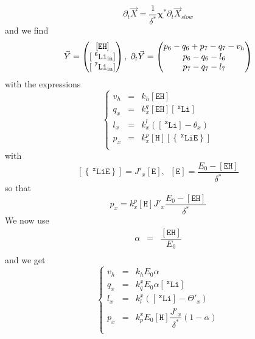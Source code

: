 \documentclass[aps,onecolumn,12pt]{revtex4}
\newcommand{\mychem}[1]{\mathtt{#1}}
\newcommand{\myconc}[1]{\left\lbrack{#1}\right\rbrack}
\newcommand{\spLi}[1]{{~^{\mychem{#1}}\mychem{Li}}}
\newcommand{\Li}[1]{\myconc{\spLi{#1}}}
\newcommand{\spEout}{\mychem{E}}
\newcommand{\Eout}{\myconc{\spEout}}
\newcommand{\spLiE}[1]{\left\lbrace\spLi{#1}\spEout\right\rbrace}
\newcommand{\LiE}[1]{\myconc{\spLiE{#1}}}
\newcommand{\spLiIn}[1]{{\spLi{#1}}_{\mathrm{in}}}
\newcommand{\LiIn}[1]{\myconc{\spLiIn{#1}}}
\newcommand{\spEHin}{\mychem{EH}}
\newcommand{\EHin}{\myconc{\spEHin}}
\newcommand{\spproton}{\mychem{H}}
\newcommand{\proton}{\myconc{\spproton}}
\newcommand{\mymat}[1]{{\bm{#1}}}
\begin{document}
\begin{equation}
	\partial_t\vec{X} = \dfrac{1}{\delta^\ast}
	\mymat{\chi}^\ast \partial_t\vec{X}_{slow}
\end{equation}
and we find
\begin{equation}
	\vec{Y} = \begin{pmatrix} \EHin \cr \LiIn{6} \cr \LiIn{7} \end{pmatrix}
	,\;\partial_t \vec{Y} = 
	\begin{pmatrix}
	p_6-q_6+p_7-q_7-v_h\\
	p_6-q_6-l_6\\
	p_7-q_7-l_7
	\end{pmatrix}
\end{equation}
with the expressions
\begin{equation}
\left\lbrace
	\begin{array}{rcl}
	v_h & = & k_h \EHin \\
	q_x & = & k_x^q \EHin \Li{x}  \\
	l_x & = & k_x^l \left(\Li{x}-\theta_x\right)\\
	p_x & = & k_x^p \proton \LiE{x}\\
	\end{array}
\right.
\end{equation}
with
\begin{equation}
	\LiE{x} = J'_x \Eout,\;\;\Eout=\dfrac{E_0-\EHin}{\delta^\ast}
\end{equation}
so that
\begin{equation}
	p_x = k_x^p \proton  J'_x \dfrac{E_0-\EHin}{\delta^\ast}
\end{equation}
We now use
\begin{equation}
	\begin{array}{rcl}
	\alpha    & = &\dfrac{\EHin}{E_0}\\
	\end{array}
\end{equation}
and we get
\begin{equation}
	\left\lbrace
	\begin{array}{rcl}
	v_h & = & k_h E_0 \alpha \\
	q_x & = & k_q^x E_0 \alpha \Li{x}  \\
	l_x & = & k_l^x \left(\Li{x} -\Theta'_x\right)\\
	p_x & = & k_p^x E_0 \proton \dfrac{J'_x}{\delta^\ast}(1-\alpha) \\
	\end{array}
\right.
\end{equation}
\end{document}
